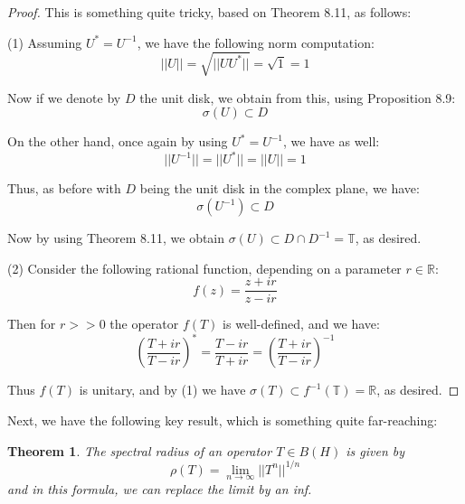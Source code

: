 \documentclass[12pt]{amsbook}
\newtheorem{theorem}{Theorem}[chapter]
\begin{document}
\begin{proof}
This is something quite tricky, based on Theorem 8.11, as follows:

\medskip

(1) Assuming $U^*=U^{-1}$, we have the following norm computation:
$$||U||
=\sqrt{||UU^*||}
=\sqrt{1}
=1$$

Now if we denote by $D$ the unit disk, we obtain from this, using Proposition 8.9:
$$\sigma(U)\subset D$$

On the other hand, once again by using $U^*=U^{-1}$, we have as well:
$$||U^{-1}||
=||U^*||
=||U||
=1$$

Thus, as before with $D$ being the unit disk in the complex plane, we have:
$$\sigma(U^{-1})\subset D$$

Now by using Theorem 8.11, we obtain $\sigma(U)
\subset D\cap D^{-1}
=\mathbb T$, as desired.

\medskip

(2) Consider the following rational function, depending on a parameter $r\in\mathbb R$:
$$f(z)=\frac{z+ir}{z-ir}$$

Then for $r>>0$ the operator $f(T)$ is well-defined, and we have:
$$\left(\frac{T+ir}{T-ir}\right)^*
=\frac{T-ir}{T+ir}
=\left(\frac{T+ir}{T-ir}\right)^{-1}$$

Thus $f(T)$ is unitary, and by (1) we have $\sigma(T)\subset f^{-1}(\mathbb T)=\mathbb R$, as desired.
\end{proof}

Next, we have the following key result, which is something quite far-reaching:

\begin{theorem}
The spectral radius of an operator $T\in B(H)$ is given by
$$\rho(T)=\lim_{n\to\infty}||T^n||^{1/n}$$
and in this formula, we can replace the limit by an inf.
\end{theorem}
\end{document}
